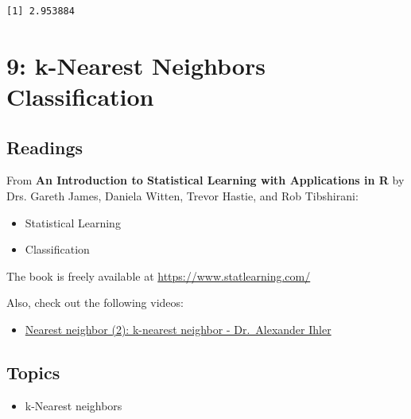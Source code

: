 \documentclass[
  letterpaper,
  DIV=11,
  numbers=noendperiod]{scrreprt}
\newenvironment{Shaded}{\begin{snugshade}}{\end{snugshade}}
\newcommand{\DecValTok}[1]{\textcolor[rgb]{0.68,0.00,0.00}{#1}}
\newcommand{\FunctionTok}[1]{\textcolor[rgb]{0.28,0.35,0.67}{#1}}
\newcommand{\NormalTok}[1]{\textcolor[rgb]{0.00,0.23,0.31}{#1}}
\newcommand{\SpecialCharTok}[1]{\textcolor[rgb]{0.37,0.37,0.37}{#1}}
\providecommand{\tightlist}{%
  \setlength{\itemsep}{0pt}\setlength{\parskip}{0pt}}\usepackage{longtable,booktabs,array}
\begin{document}
\begin{tcolorbox}
\begin{Shaded}
\end{Shaded}

\begin{verbatim}
[1] 2.953884
\end{verbatim}

\end{tcolorbox}

\chapter{9: k-Nearest Neighbors
Classification}\label{k-nearest-neighbors-classification}

\section{Readings}\label{readings-10}

From \textbf{An Introduction to Statistical Learning with Applications
in R} by Drs. Gareth James, Daniela Witten, Trevor Hastie, and Rob
Tibshirani:

\begin{itemize}
\item
  Statistical Learning
\item
  Classification
\end{itemize}

The book is freely available at \url{https://www.statlearning.com/}

Also, check out the following videos:

\begin{itemize}
\tightlist
\item
  \href{https://youtu.be/ZWygMcenuWM?si=kfuOiTi7lwik8tfR}{Nearest
  neighbor (2): k-nearest neighbor - Dr.~Alexander Ihler}
\end{itemize}

\section{Topics}\label{topics-12}

\begin{itemize}
\tightlist
\item
  k-Nearest neighbors
\end{itemize}
\end{document}
